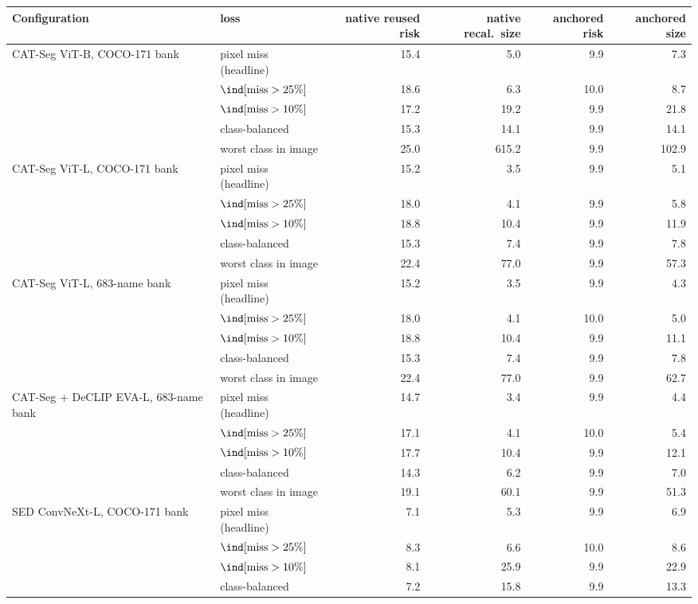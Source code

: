 \begin{tabular}{@{}llrrrr@{}}
\toprule
Configuration & loss & native reused risk & native recal.\ size & anchored risk & anchored size \\
\midrule
CAT-Seg ViT-B, COCO-171 bank & pixel miss (headline) & 15.4 & 5.0 & 9.9 & 7.3 \\
 & $\ind[\text{miss} > 25\%]$ & 18.6 & 6.3 & 10.0 & 8.7 \\
 & $\ind[\text{miss} > 10\%]$ & 17.2 & 19.2 & 9.9 & 21.8 \\
 & class-balanced & 15.3 & 14.1 & 9.9 & 14.1 \\
 & worst class in image & 25.0 & 615.2 & 9.9 & 102.9 \\
\midrule
CAT-Seg ViT-L, COCO-171 bank & pixel miss (headline) & 15.2 & 3.5 & 9.9 & 5.1 \\
 & $\ind[\text{miss} > 25\%]$ & 18.0 & 4.1 & 9.9 & 5.8 \\
 & $\ind[\text{miss} > 10\%]$ & 18.8 & 10.4 & 9.9 & 11.9 \\
 & class-balanced & 15.3 & 7.4 & 9.9 & 7.8 \\
 & worst class in image & 22.4 & 77.0 & 9.9 & 57.3 \\
\midrule
CAT-Seg ViT-L, 683-name bank & pixel miss (headline) & 15.2 & 3.5 & 9.9 & 4.3 \\
 & $\ind[\text{miss} > 25\%]$ & 18.0 & 4.1 & 10.0 & 5.0 \\
 & $\ind[\text{miss} > 10\%]$ & 18.8 & 10.4 & 9.9 & 11.1 \\
 & class-balanced & 15.3 & 7.4 & 9.9 & 7.8 \\
 & worst class in image & 22.4 & 77.0 & 9.9 & 62.7 \\
\midrule
CAT-Seg + DeCLIP EVA-L, 683-name bank & pixel miss (headline) & 14.7 & 3.4 & 9.9 & 4.4 \\
 & $\ind[\text{miss} > 25\%]$ & 17.1 & 4.1 & 10.0 & 5.4 \\
 & $\ind[\text{miss} > 10\%]$ & 17.7 & 10.4 & 9.9 & 12.1 \\
 & class-balanced & 14.3 & 6.2 & 9.9 & 7.0 \\
 & worst class in image & 19.1 & 60.1 & 9.9 & 51.3 \\
\midrule
SED ConvNeXt-L, COCO-171 bank & pixel miss (headline) & 7.1 & 5.3 & 9.9 & 6.9 \\
 & $\ind[\text{miss} > 25\%]$ & 8.3 & 6.6 & 10.0 & 8.6 \\
 & $\ind[\text{miss} > 10\%]$ & 8.1 & 25.9 & 9.9 & 22.9 \\
 & class-balanced & 7.2 & 15.8 & 9.9 & 13.3 \\

\end{tabular}
